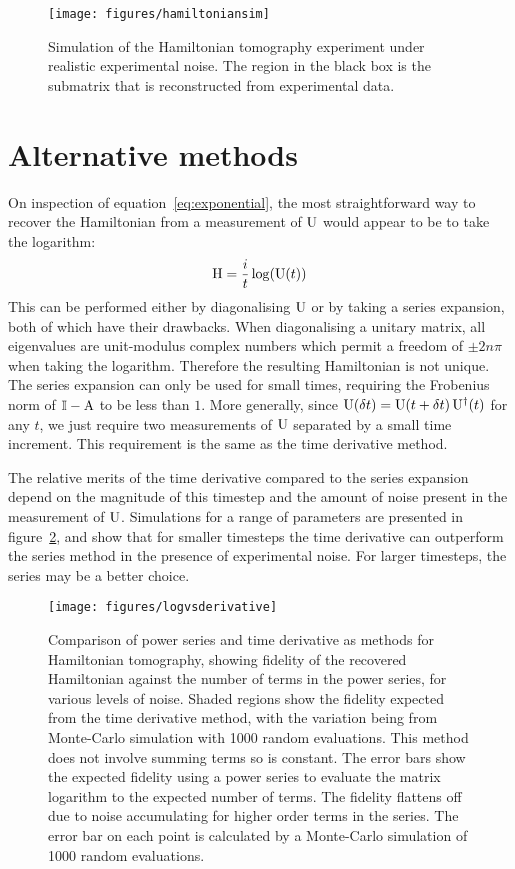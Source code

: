 \begin{figure}
  \centering
  \texttt{[image: figures/hamiltoniansim]}
  \caption[Simulation of the Hamiltonian tomography under experimental noise]
  {Simulation of the Hamiltonian tomography experiment under realistic
  experimental noise. The region in the black box is the submatrix that is
  reconstructed from experimental data.}
  \label{fig:hamiltoniansim}
\end{figure}

\section{Alternative methods}
\label{sec:Alternatives}
On inspection of equation~\ref{eq:exponential}, the most straightforward way to
recover the Hamiltonian from a measurement of \(\mathrm{U}\) would appear to be to
take the logarithm:
\begin{equation}
  \mathrm{H} = \frac{i}{t} \log \!\left(\mathrm{U} \!\left(t\right)\right)
\end{equation}
This can be performed either by diagonalising \(\mathrm{U}\) or by taking a series
expansion, both of which have their drawbacks. When diagonalising a unitary
matrix, all eigenvalues are unit-modulus complex numbers which permit a freedom
of \(\pm 2 n \pi\) when taking the logarithm. Therefore the resulting
Hamiltonian is not unique. The series expansion can only be used for small
times, requiring the Frobenius norm of \(\mathbb{I}-\mathrm{A}\) to be less than
\(1\). More generally, since \(\mathrm{U} \!\left(\delta t\right) = \mathrm{U} \!\left(t+\delta t\right)
\mathrm{U}^{\dagger} \!\left(t\right)\) for any \(t\), we just require two measurements of
\(\mathrm{U}\) separated by a small time increment. This requirement is the same as
the time derivative method.

The relative merits of the time derivative compared to the series expansion
depend on the magnitude of this timestep and the amount of noise present in the
measurement of \(\mathrm{U}\). Simulations for a range of parameters are presented
in figure~\ref{fig:logvsderivative}, and show that for smaller timesteps the
time derivative can outperform the series method in the presence of experimental
noise. For larger timesteps, the series may be a better choice.

\begin{figure}[h]
  \texttt{[image: figures/logvsderivative]}
  \caption[Comparison of power series and time derivative methods for
  Hamiltonian recovery]
  {Comparison of power series and time derivative as methods for Hamiltonian
  tomography, showing fidelity of the recovered Hamiltonian against the number
  of terms in the power series, for various levels of noise. Shaded regions show
  the fidelity expected from the time derivative method, with the variation
  being from Monte-Carlo simulation with 1000 random evaluations. This method
  does not involve summing terms so is constant. The error bars show the
  expected fidelity using a power series to evaluate the matrix logarithm to the
  expected number of terms. The fidelity flattens off due to noise accumulating
  for higher order terms in the series. The error bar on each point is
  calculated by a Monte-Carlo simulation of 1000 random evaluations.}
  \label{fig:logvsderivative}
\end{figure}

